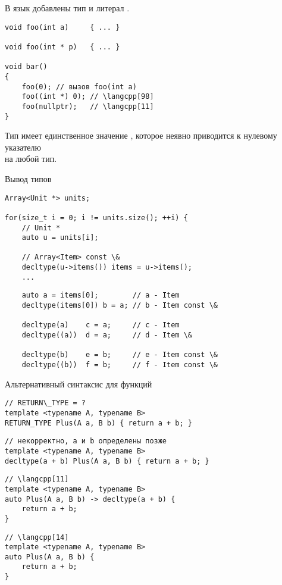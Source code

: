 \documentclass{beamer}
\begin{document}
\begin{frame}[fragile]{}
    В язык добавлены тип  и литерал .

\begin{lstlisting}          
void foo(int a)     { ... }

void foo(int * p)   { ... }

void bar() 
{
    foo(0); // вызов foo(int a)
    foo((int *) 0); // \langcpp[98]
    foo(nullptr);   // \langcpp[11]
}
\end{lstlisting}
\medskip
Тип  имеет единственное значение ,
которое неявно приводится к нулевому указателю\\ на любой тип.
\end{frame}

\begin{frame}[fragile]{Вывод типов}
\begin{lstlisting}
Array<Unit *> units;

for(size_t i = 0; i != units.size(); ++i) {
    // Unit *
    auto u = units[i]; 	    
    
    // Array<Item> const \& 
    decltype(u->items()) items = u->items();
    ...
\end{lstlisting}
\pause
\begin{lstlisting}
    auto a = items[0];        // a - Item  
    decltype(items[0]) b = a; // b - Item const \& 
    
    decltype(a)    c = a;     // c - Item
    decltype((a))  d = a;     // d - Item \&

    decltype(b)    e = b;     // e - Item const \&
    decltype((b))  f = b;     // f - Item const \&
\end{lstlisting}
\end{frame}

\begin{frame}[fragile]{Альтернативный синтаксис для функций}
\begin{lstlisting}
// RETURN\_TYPE = ?
template <typename A, typename B> 
RETURN_TYPE Plus(A a, B b) { return a + b; }
\end{lstlisting}
\begin{lstlisting}
// некорректно, a и b определены позже
template <typename A, typename B> 
decltype(a + b) Plus(A a, B b) { return a + b; }
\end{lstlisting}
%
\begin{lstlisting}
// \langcpp[11]
template <typename A, typename B> 
auto Plus(A a, B b) -> decltype(a + b) { 
    return a + b; 
}
\end{lstlisting}
\begin{lstlisting}
// \langcpp[14]
template <typename A, typename B> 
auto Plus(A a, B b) {
    return a + b;
}
\end{lstlisting}
\end{frame}
\end{document}
